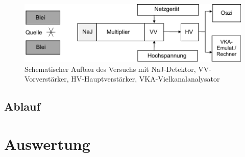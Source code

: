 \documentclass[
	parskip=half,10pt,
	numbers= noenddot, %
	toc=flat, %
	oneside,
	twocolumn,
	]{scrartcl}
\begin{document}
\begin{figure}[h]
\centering
\includegraphics[width=.8\textwidth]{images/aufbau.pdf}
\caption{Schematischer Aufbau des Versuchs \cite{wiki} mit NaJ-Detektor, VV-Vorverstärker, HV-Hauptverstärker, VKA-Vielkanalanalysator}
\label{fig:aufbau}
\end{figure}

\subsection{Ablauf}

\section{Auswertung}


\newpage


\end{document}
